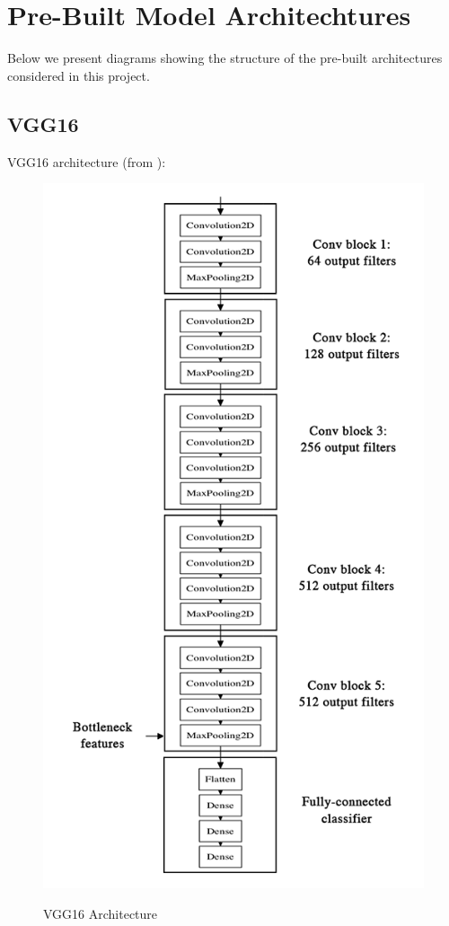 \documentclass[11pt]{article} %
\theoremstyle{plain}
\theoremstyle{definition}
\begin{document}
\newpage
\section{Pre-Built Model Architechtures} \label{Model-Architectures-Appendix}
Below we present diagrams showing the structure of the pre-built architectures considered in this project.
\subsection{VGG16}
VGG16 architecture (from \cite{VGG16_Webpage}):
\begin{figure}[!ht]
\centering
\includegraphics[scale=0.4]{vgg16_original.png}
\label{fig:vgg16_original}
\caption{VGG16 Architecture}
\end{figure}
\FloatBarrier
\end{document}
